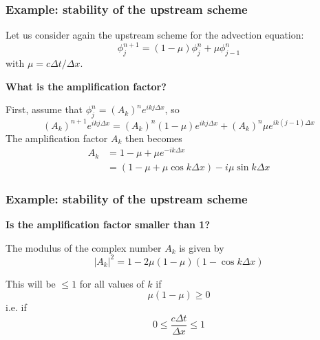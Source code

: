 \documentclass[aspectratio=149,9pt]{beamer}
\begin{document}
%
%
\begin{frame}
	\frametitle{Example: stability of the upstream scheme}
	Let us consider again the upstream scheme for the advection equation:
	\begin{equation*}
		\phi_j^{n+1} = (1-\mu) \phi_j^n + \mu \phi_{j-1}^n
	\end{equation*}
	with $\mu = c \Delta t / \Delta x$.
	\par\vspace*{6ex}
	\textbf{What is the amplification factor?}
\pause
	\par\vspace*{4ex}
	First, assume that $\phi_j^n=(A_k)^ne^{ikj\Delta x}$, so\vspace*{2ex}
	\begin{equation*}
		(A_k)^{n+1} e^{ik j \Delta x} = (A_k)^{n}(1-\mu )e^{ikj \Delta x}
		+ (A_k)^{n}\mu e^{ik(j-1) \Delta x}
	\end{equation*}
\pause
	The amplification factor $A_k$ then becomes
	\begin{align*}
		A_k &= 1 -\mu +\mu e^{-ik \Delta x}	\\
			&=(1-\mu+\mu\cos k\Delta x) - i \mu\sin k\Delta x
	\end{align*}
\end{frame}
%
%
\begin{frame}
	\frametitle{Example: stability of the upstream scheme}
	\textbf{Is the amplification factor smaller than 1?}
\pause
\par\vspace*{2ex}
	The modulus of the complex number $A_k$ is given by
	\begin{equation*}
		| A_k |^2 = 1 - 2 \mu \left( 1 -\mu \right) \left( 1 - \cos k \Delta x \right)
	\end{equation*}
\pause
	\par\vspace*{2ex}
	This will be $\le 1$ for all values of $k$ if
	\begin{equation*}
		\mu \left( 1 - \mu \right) \ge 0
	\end{equation*}
	i.e. if
	\begin{equation*}
		0 \le \frac{c \Delta t }{\Delta x} \le 1
	\end{equation*}
\end{frame}
%
\end{document}
